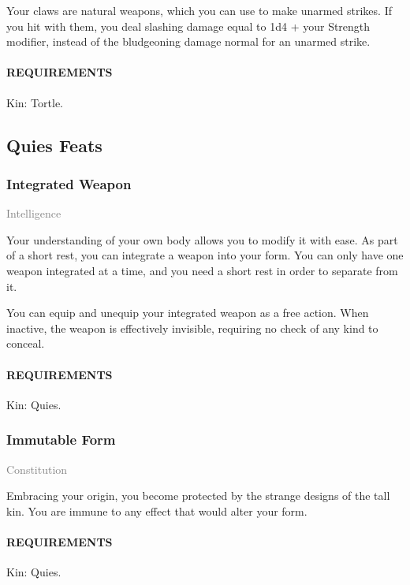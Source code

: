     \normalsize
    Your claws are natural weapons, which you can use to make unarmed strikes.
    If you hit with them, you deal slashing damage equal to 1d4 + your Strength modifier, instead of the bludgeoning damage normal for an unarmed strike.
    \paragraph{REQUIREMENTS} Kin: Tortle.

\subsection*{Quies Feats}
    \subsubsection{Integrated Weapon} \label{feat::integratedweapon}
    \small{\textcolor{gray}{Intelligence}}

    \normalsize
    Your understanding of your own body allows you to modify it with ease.
    As part of a short rest, you can integrate a weapon into your form.
    You can only have one weapon integrated at a time, and you need a short rest in order to separate from it.

    You can equip and unequip your integrated weapon as a free action.
    When inactive, the weapon is effectively invisible, requiring no check of any kind to conceal.
    \paragraph{REQUIREMENTS} Kin: Quies.

    \subsubsection{Immutable Form} \label{feat::immutableform}
    \small{\textcolor{gray}{Constitution}}

    \normalsize
    Embracing your origin, you become protected by the strange designs of the tall kin.
    You are immune to any effect that would alter your form.
    \paragraph{REQUIREMENTS} Kin: Quies.

